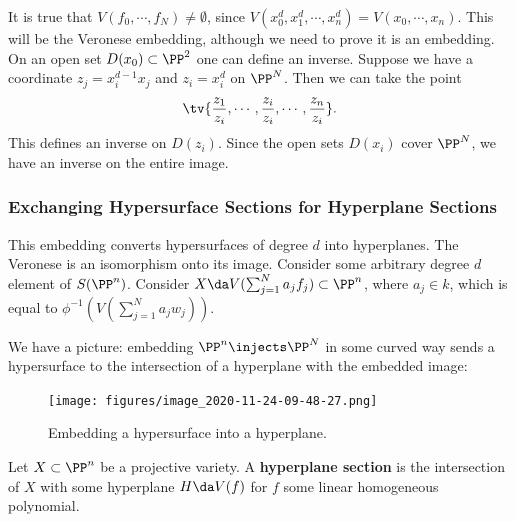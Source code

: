 \begin{remark}

It is true that \(V(f_0, \cdots, f_N) \neq \emptyset\), since
\(V(x_0^d, x_1^d, \cdots, x_n^d) = V(x_0, \cdots, x_n)\). This will be
the Veronese embedding, although we need to prove it is an embedding. On
an open set \(D(x_0) \subset \PP^2\) one can define an inverse. Suppose
we have a coordinate \(z_j = x_i^{d-1} x_j\) and \(z_i = x_i^d\) on
\(\PP^N\). Then we can take the point
\begin{align*}  
\tv{ {z_1 \over z_i}, \cdots, {z_i \over z_i}, \cdots, {z_n \over z_i} }
.\end{align*} This defines an inverse on \(D(z_i)\). Since the open sets
\(D(x_i)\) cover \(\PP^N\), we have an inverse on the entire image.

\end{remark}

\hypertarget{exchanging-hypersurface-sections-for-hyperplane-sections}{%
\subsubsection{Exchanging Hypersurface Sections for Hyperplane
Sections}\label{exchanging-hypersurface-sections-for-hyperplane-sections}}

\begin{remark}

This embedding converts hypersurfaces of degree \(d\) into hyperplanes.
The Veronese is an isomorphism onto its image. Consider some arbitrary
degree \(d\) element of \(S(\PP^n)\). Consider
\(X \da V(\sum_{j=1}^N a_j f_j) \subset\PP^n\), where \(a_j\in k\),
which is equal to \(\phi^{-1}(V(\sum_{j=1}^N a_j w_j ))\).


We have a picture: embedding \(\PP^n\injects \PP^N\) in some curved way
sends a hypersurface to the intersection of a hyperplane with the
embedded image:

\begin{figure}
\centering
\texttt{[image: figures/image\_2020-11-24-09-48-27.png]}
\caption{Embedding a hypersurface into a hyperplane.}
\end{figure}

\end{remark}

\begin{definition}

Let \(X \subset\PP^n\) be a projective variety. A \textbf{hyperplane
section} is the intersection of \(X\) with some hyperplane
\(H \da V(f)\) for \(f\) some linear homogeneous polynomial.

\end{definition}

